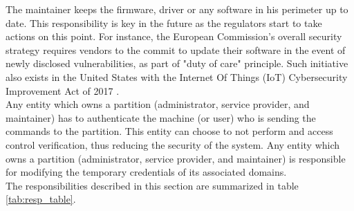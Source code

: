 \documentclass[conference]{IEEEtran}
\begin{document}
The maintainer keeps the firmware, driver or any software in his perimeter up to date. This responsibility is key in the future as the regulators start to take actions on this point. For instance, the European Commission's overall security strategy \cite{enisa_iot_2017} requires vendors to the commit to update their software in the event of newly disclosed vulnerabilities, as part of "duty of care" principle. Such initiative also exists in the United States with the Internet Of Things (IoT) Cybersecurity Improvement Act of 2017 \cite{IOTAct_2017}.\\

Any entity which owns a partition (administrator, service provider, and maintainer) has to authenticate the machine (or user) who is sending the commands to the partition. This entity can choose to not perform and access control verification, thus reducing the security of the system. Any entity which owns a partition (administrator, service provider, and maintainer) is responsible for modifying the temporary credentials of its associated domains.\\

The responsibilities described in this section are summarized in table \ref{tab:resp_table}.\\
\end{document}
